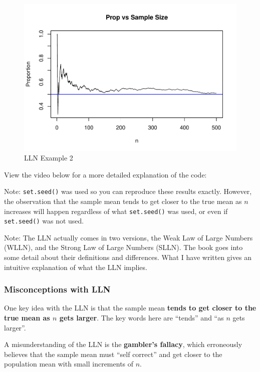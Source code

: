 \documentclass[
]{book}
\begin{document}
\begin{figure}
\centering
\includegraphics{bookdown-demo_files/figure-latex/4-LLN2-1.pdf}
\caption{\label{fig:4-LLN2}LLN Example 2}
\end{figure}

View the video below for a more detailed explanation of the code:

Note: \texttt{set.seed()} was used so you can reproduce these results exactly. However, the observation that the sample mean tends to get closer to the true mean as \(n\) increases will happen regardless of what \texttt{set.seed()} was used, or even if \texttt{set.seed()} was not used.

Note: The LLN actually comes in two versions, the Weak Law of Large Numbers (WLLN), and the Strong Law of Large Numbers (SLLN). The book goes into some detail about their definitions and differences. What I have written gives an intuitive explanation of what the LLN implies.

\subsubsection{Misconceptions with LLN}\label{misconceptions-with-lln}

One key idea with the LLN is that the sample mean \textbf{tends to get closer to the true mean as \(n\) gets larger}. The key words here are ``tends'' and ``as \(n\) gets larger''.

A misunderstanding of the LLN is the \textbf{gambler's fallacy}, which erroneously believes that the sample mean must ``self correct'' and get closer to the population mean with small increments of \(n\).
\end{document}
